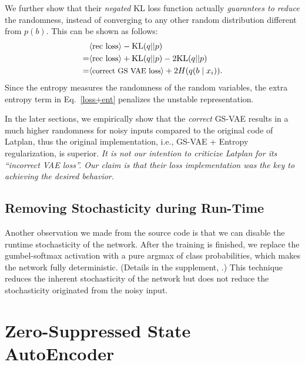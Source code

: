 We further show that their \emph{negated} KL loss function
actually \emph{guarantees to reduce} the randomness,
instead of converging to any other random distribution different from $p(b)$.
This can be shown as follows:
\begin{align} 
\nonumber  &\brackets{\text{rec loss}}-{\mathrm{KL}}(q||p)                                    \\
\nonumber =&\brackets{\text{rec loss}}+{\mathrm{KL}}(q||p) - 2 {\mathrm{KL}}(q||p)          \\
\label{loss+ent} =&\brackets{\text{\small correct GS VAE loss}}      + 2 H(q(b \mid x_i)).
\end{align}
Since the entropy measures the randomness of the random variables,
the extra entropy term in Eq.~\eqref{loss+ent} penalizes the unstable representation.

In the later sections, we empirically show that the \emph{correct} GS-VAE results in
a much higher randomness for noisy inputs compared to the original code of Latplan,
thus the original implementation, i.e., GS-VAE + Entropy regularization, is superior.
% 
\emph{It is not our intention to criticize Latplan for its ``incorrect VAE loss''.
Our claim is that their loss implementation was the key to achieving the desired behavior.}

\subsection{Removing Stochasticity during Run-Time}
\label{argmax}

Another observation we made from the source code is that we can
disable the runtime stochasticity of the network.
After the training is finished, we replace the gumbel-softmax activation with
a pure argmax of class probabilities, which makes the network fully deterministic.
(Details in the supplement, .)
This technique reduces the inherent stochasticity of the network
but does not reduce the stochasticity originated from the noisy input.

\section{Zero-Suppressed State AutoEncoder}
\label{zsae}

